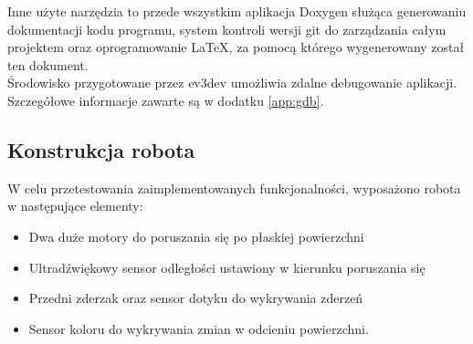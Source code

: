 Inne użyte narzędzia to przede wszystkim aplikacja Doxygen służąca generowaniu dokumentacji kodu programu, system kontroli wersji \gls{git} do zarządzania całym projektem oraz oprogramowanie LaTeX, za pomocą którego wygenerowany został ten dokument.\\

Środowisko przygotowane przez ev3dev umożliwia zdalne debugowanie aplikacji. Szczegółowe informacje zawarte są w dodatku \ref{app:gdb}.

\subsection{Konstrukcja robota}
W celu przetestowania zaimplementowanych funkcjonalności, wyposażono robota w następujące elementy:
\begin{itemize}
    \item Dwa duże motory do poruszania się po płaskiej powierzchni
    \item Ultradźwiękowy sensor odległości ustawiony w kierunku poruszania się
    \item Przedni zderzak oraz sensor dotyku do wykrywania zderzeń
    \item Sensor koloru do wykrywania zmian w odcieniu powierzchni.
\end{itemize}
